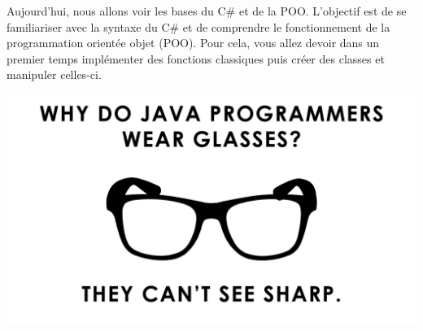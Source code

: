 Aujourd'hui, nous allons voir les bases du C\# et de la POO. L'objectif est de se familiariser avec la syntaxe du C\# et de comprendre le fonctionnement de la programmation orientée objet (POO). Pour cela, vous allez devoir dans un premier temps implémenter des fonctions classiques puis créer des classes et manipuler celles-ci.

\begin{center}
  \includegraphics[width=\textwidth]{img/intro.png}
\end{center}